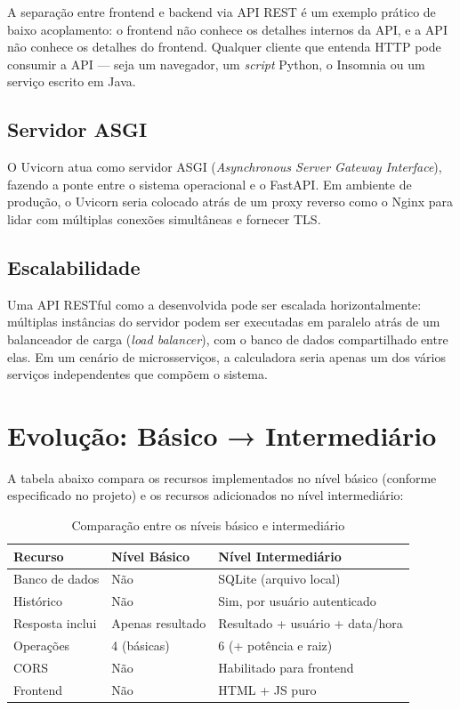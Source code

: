\documentclass[12pt, a4paper]{article}
\begin{document}
A separação entre frontend e backend via API REST é um exemplo prático de baixo acoplamento: o frontend não conhece os detalhes internos da API, e a API não conhece os detalhes do frontend. Qualquer cliente que entenda HTTP pode consumir a API — seja um navegador, um \textit{script} Python, o Insomnia ou um serviço escrito em Java.

\subsection{Servidor ASGI}

O Uvicorn atua como servidor ASGI (\textit{Asynchronous Server Gateway Interface}), fazendo a ponte entre o sistema operacional e o FastAPI. Em ambiente de produção, o Uvicorn seria colocado atrás de um proxy reverso como o Nginx para lidar com múltiplas conexões simultâneas e fornecer TLS.

\subsection{Escalabilidade}

Uma API RESTful como a desenvolvida pode ser escalada horizontalmente: múltiplas instâncias do servidor podem ser executadas em paralelo atrás de um balanceador de carga (\textit{load balancer}), com o banco de dados compartilhado entre elas. Em um cenário de microsserviços, a calculadora seria apenas um dos vários serviços independentes que compõem o sistema.

\section{Evolução: Básico → Intermediário}

A tabela abaixo compara os recursos implementados no nível básico (conforme especificado no projeto) e os recursos adicionados no nível intermediário:

\begin{table}[H]
  \centering
  \caption{Comparação entre os níveis básico e intermediário}
  \begin{tabularx}{\linewidth}{lXX}
    \toprule
    \textbf{Recurso} & \textbf{Nível Básico} & \textbf{Nível Intermediário} \\
    \midrule
    Banco de dados    & Não             & SQLite (arquivo local) \\
    Histórico         & Não             & Sim, por usuário autenticado \\
    Resposta inclui   & Apenas resultado & Resultado + usuário + data/hora \\
    Operações         & 4 (básicas)      & 6 (+ potência e raiz) \\
    CORS              & Não             & Habilitado para frontend \\
    Frontend          & Não             & HTML + JS puro \\
    \bottomrule
  \end{tabularx}
\end{table}
\end{document}
